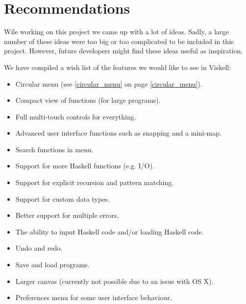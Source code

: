 \chapter{Recommendations}

Wile working on this project we came up with a lot of ideas.
Sadly, a large number of these ideas were too big or too complicated to be included in this project.
However, future developers might find these ideas useful as inspiration.

We have compiled a wish list of the features we would like to see in Viskell:

\begin{itemize}
	\item Circular menu (see \ref{circular_menu} on page \ref{circular_menu}).
	\item Compact view of functions (for large programs).
	\item Full multi-touch controls for everything.
	\item Advanced user interface functions such as snapping and a mini-map.
	\item Search functions in menu.
	\item Support for more Haskell functions (e.g. I/O).
	\item Support for explicit recursion and pattern matching.
	\item Support for custom data types.
	\item Better support for multiple errors.
	\item The ability to input Haskell code and/or loading Haskell code.
	\item Undo and redo.
	\item Save and load programs.
	\item Larger canvas (currently not possible due to an issue with OS X).
	\item Preferences menu for some user interface behaviour.
\end{itemize}
